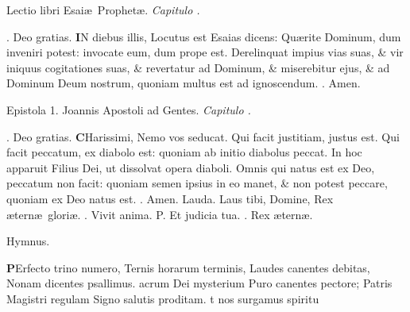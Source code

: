 \documentclass[letter,11pt]{book}
\makeatletter
\DeclareRobustCommand{\Vbar}{\vers@resp{-0.1em}{V}}
\DeclareRobustCommand{\Rbar}{\vers@resp{0pt}{R}}
\newcommand{\vers@resp@sym}{\raisebox{0.2ex}{\rotatebox[origin=c]{-20}{$\m@th\rceil$}}}
\newcommand{\vers@resp}[2]{%
  {\ooalign{\hidewidth\kern#1\vers@resp@sym\hidewidth\cr#2\cr}}%
}%
\def\P{\color{Red} P. \color{black}}
\def\V{\color{Red} \Vbar . \color{black}}
\def\R{\color{Red} \Rbar . \color{black}}
\makeatother
\begin{document}
\begin{multicols*}{2}
\vspace{-.5em} \begin{center} {\color{Red} L}ectio libri Esai\ae \ Prophet\ae . \itshape Capitulo . \end{center} \vspace{-.5em}
\par \noindent \R Deo gratias.
\lettrine[lines=2]{\bfseries \color{Red} I}{}N diebus illis, Locutus est Esaias dicens: Qu\ae rite Dominum, dum inveniri potest: invocate eum, dum prope est.
Derelinquat impius vias suas, \& vir iniquus cogitationes suas, \& revertatur ad Dominum, \& miserebitur ejus, \& ad Dominum Deum nostrum, quoniam multus est ad ignoscendum. \R Amen.
\vspace{-.5em} \begin{center} {\color{Red} E}pistola 1. Joannis Apostoli ad Gentes. \itshape Capitulo . \end{center} \vspace{-.5em}
\par \noindent \R Deo gratias.
\lettrine[lines=2]{\bfseries \color{Red} C}{}Harissimi, Nemo vos seducat. Qui facit justitiam, justus est. Qui facit peccatum, ex diabolo est: quoniam ab initio diabolus peccat. In hoc apparuit Filius Dei, ut dissolvat opera diaboli. Omnis qui natus est ex Deo, peccatum non facit: quoniam semen ipsius in eo manet, \& non potest peccare, quoniam ex Deo natus est. \R Amen.
\newline \color{Red} Lauda. \color{black} Laus tibi, Domine, Rex \ae tern\ae \ glori\ae . \V Vivit anima. \P Et judicia tua. \V Rex \ae tern\ae .
\vspace{-.5em} \begin{center} \color{Red} Hymnus. \end{center} \vspace{-.5em}
\lettrine[lines=2]{\bfseries \color{Red} P}{}Erfecto trino numero,
\newline Ternis horarum terminis,
\newline \indent Laudes canentes debitas,
\newline \indent Nonam dicentes psallimus.
acrum Dei mysterium
\newline \indent Puro canentes pectore;
\newline \indent Patris Magistri regulam
\newline \indent Signo salutis proditam.
t nos surgamus spiritu

\end{multicols*}
\end{document}
